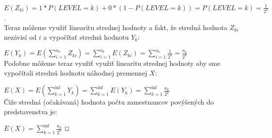 \documentclass[a4paper]{article}
\begin{document}
$E(Z_{ki})=1*P(LEVEL=k) + 0*(1-P(LEVEL=k))=P(LEVEL=k)=\frac{1}{2^k}$.
\\

Teraz môžeme využiť linearitu strednej hodnoty a fakt, že stredná hodnota $Z_{ki}$ nezávisí od $i$ a vypočítať strednú hodnotu $Y_k$:

$E(Y_k) = E(\sum_{i=1}^{a_k} Z_{ki}) = \sum_{i=1}^{a_k} E(Z_{ki}) = \sum_{i=1}^{a_k} \frac{1}{2^k} = \frac{a_k}{2^k} $
\\

Podobne môžeme teraz využiť využiť linearitu strednej hodnoty aby sme vypočítali strednú hodnotu náhodnej premennej $X$:

$E(X) = E(\sum_{k=1}^{\inf} Y_k) = \sum_{k=1}^{\inf} E(Y_k) = \sum_{k=1}^{\inf} \frac{a_k}{2^k}$
\\

Čiže stredná (očakávaná) hodnota počtu zamestnancov povýšených do predstavenstva je:

$E(X) = \sum_{k=1}^{\inf} \frac{a_k}{2^k}$ $\oblong$
\end{document}
